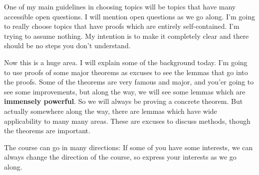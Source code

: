 One of my main guidelines in choosing topics will be topics that have many accessible open questions. I will mention open questions as we go along. I'm going to really choose topics that have proofs which are entirely self-contained. I'm trying to assume nothing. My intention is to make it completely clear and there should be no steps you don't understand. 

Now this is a huge area. I will explain some of the background today. I'm going to use proofs of some major theorems as excuses to see the lemmas that go into the proofs. Some of the theorems are very famous and major, and you'er going to see some improvements, but along the way, we will see some lemmas which are \textbf{immensely powerful}. So we will always be proving a concrete theorem. But actually somewhere along the way, there are lemmas which have wide applicability to many many areas. These are excuses to discuss methods, though the theorems are important. 

The course can go in many directions: If some of you have some interests, we can always change the direction of the course, so express your interests as we go along. 













%

%
%

\printnomenclature
\printindex
